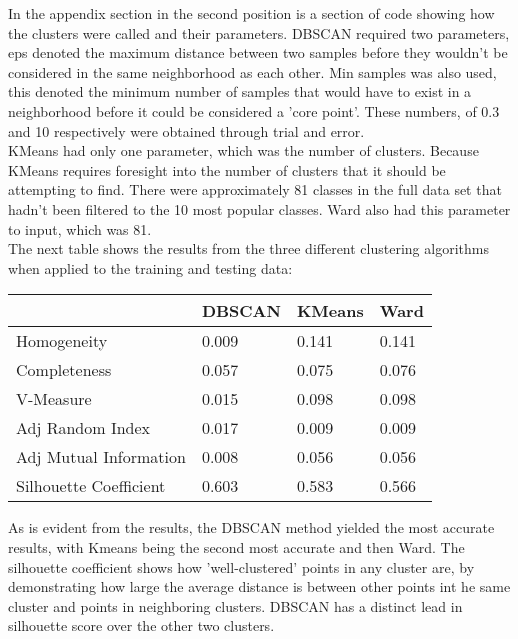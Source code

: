 \documentclass[11pt]{article}
\begin{document}
In the appendix section in the second position is a section of code showing how the clusters were called and their parameters. DBSCAN required two parameters, eps denoted the maximum distance between two samples before they wouldn't be considered in the same neighborhood as each other. Min samples was also used, this denoted the minimum number of samples that would have to exist in a neighborhood before it could be considered a 'core point'. These numbers, of 0.3 and 10 respectively were obtained through trial and error. \\

KMeans had only one parameter, which was the number of clusters. Because KMeans requires foresight into the number of clusters that it should be attempting to find. There were approximately 81 classes in the full data set that hadn't been filtered to the 10 most popular classes. Ward also had this parameter to input, which was 81. \\

The next table shows the results from the three different clustering algorithms when applied to the training and testing data:

\begin{center}
\begin{longtable}{| l | l | l | l |}
\hline
&DBSCAN                 & KMeans & Ward    \\
\hline
Homogeneity            & 0.009  & 0.141 & 0.141 \\
Completeness           & 0.057  & 0.075 & 0.076 \\
V-Measure              & 0.015  & 0.098 & 0.098 \\
Adj Random Index       & 0.017  & 0.009 & 0.009 \\
Adj Mutual Information & 0.008  & 0.056 & 0.056 \\
Silhouette Coefficient & 0.603  & 0.583 & 0.566 \\
\hline
\end{longtable}
\end{center}

As is evident from the results, the DBSCAN method yielded the most accurate results, with Kmeans being the second most accurate and then Ward. The silhouette coefficient shows how 'well-clustered' points in any cluster are, by demonstrating how large the average distance is between other points int he same cluster and points in neighboring clusters. DBSCAN has a distinct lead in silhouette score over the other two clusters.
\end{document}
